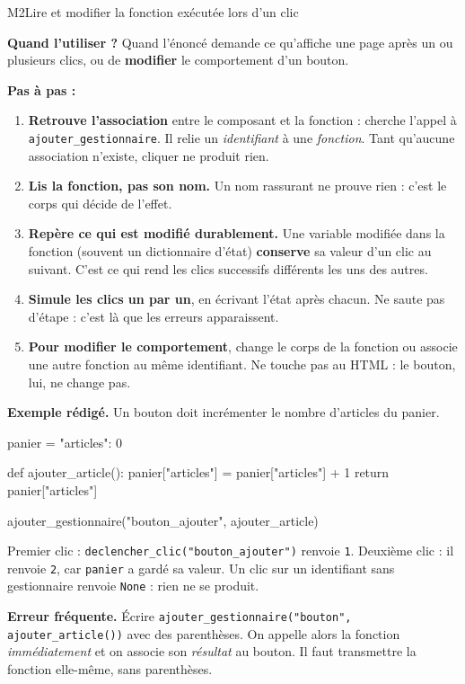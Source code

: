 \begin{fichemethode}{M2}{Lire et modifier la fonction exécutée lors d'un clic}

\textbf{Quand l'utiliser ?} Quand l'énoncé demande ce qu'affiche une page après un ou
plusieurs clics, ou de \textbf{modifier} le comportement d'un bouton.

\textbf{Pas à pas :}
\begin{enumerate}
  \item \textbf{Retrouve l'association} entre le composant et la fonction : cherche l'appel à
        \lstinline{ajouter_gestionnaire}. Il relie un \emph{identifiant} à une \emph{fonction}.
        Tant qu'aucune association n'existe, cliquer ne produit rien.
  \item \textbf{Lis la fonction, pas son nom.} Un nom rassurant ne prouve rien : c'est le corps
        qui décide de l'effet.
  \item \textbf{Repère ce qui est modifié durablement.} Une variable modifiée dans la fonction
        (souvent un dictionnaire d'état) \textbf{conserve} sa valeur d'un clic au suivant.
        C'est ce qui rend les clics successifs différents les uns des autres.
  \item \textbf{Simule les clics un par un}, en écrivant l'état après chacun. Ne saute pas
        d'étape : c'est là que les erreurs apparaissent.
  \item \textbf{Pour modifier le comportement}, change le corps de la fonction ou associe une
        autre fonction au même identifiant. Ne touche pas au HTML : le bouton, lui, ne change pas.
\end{enumerate}

\textbf{Exemple rédigé.} Un bouton doit incrémenter le nombre d'articles du panier.

\begin{python}
panier = {"articles": 0}

def ajouter_article():
    panier["articles"] = panier["articles"] + 1
    return panier["articles"]

ajouter_gestionnaire("bouton_ajouter", ajouter_article)
\end{python}

Premier clic : \lstinline{declencher_clic("bouton_ajouter")} renvoie \lstinline{1}.
Deuxième clic : il renvoie \lstinline{2}, car \lstinline{panier} a gardé sa valeur.
Un clic sur un identifiant sans gestionnaire renvoie \lstinline{None} : rien ne se produit.

\textbf{Erreur fréquente.} Écrire \lstinline{ajouter_gestionnaire("bouton", ajouter_article())}
avec des parenthèses. On appelle alors la fonction \emph{immédiatement} et on associe son
\emph{résultat} au bouton. Il faut transmettre la fonction elle-même, sans parenthèses.

\end{fichemethode}
